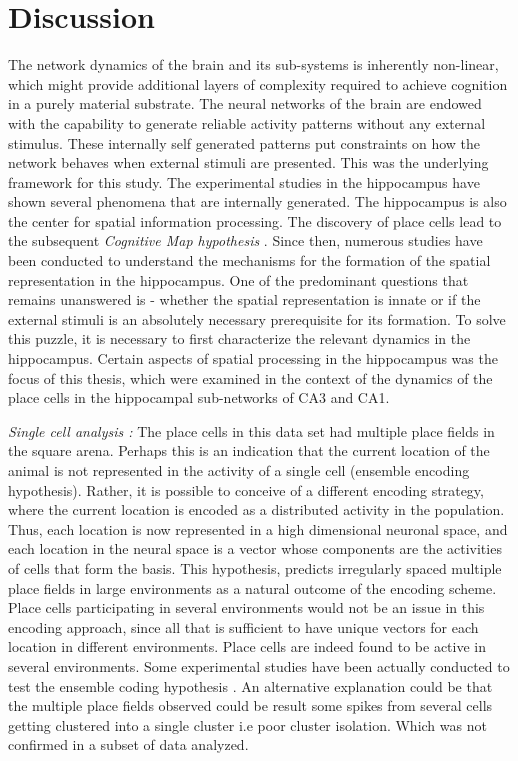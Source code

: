 \chapter{Discussion}

The network dynamics of the brain and its sub-systems is inherently non-linear, which might provide additional layers of complexity required to achieve cognition in a purely material substrate. The neural networks of the brain are endowed with the capability to generate reliable activity patterns without any external stimulus. These internally self generated patterns put constraints on how the network behaves when external stimuli are presented. This was the underlying framework for this study. The experimental studies in the hippocampus have shown several phenomena that are internally generated. The hippocampus is also the center for spatial information processing. The discovery of place cells \cite{O'Keefe1971a} lead to the subsequent \emph{Cognitive Map hypothesis} \cite{Street}. Since then, numerous studies have been conducted to understand the mechanisms for the formation of the spatial representation in the hippocampus. One of the predominant questions that remains unanswered is - whether the spatial representation is innate or if the external stimuli is an absolutely necessary prerequisite for its formation. To solve this puzzle, it is necessary to first characterize the relevant dynamics in the hippocampus. Certain aspects of spatial processing in the hippocampus was the focus of this thesis, which were examined in the context of the dynamics of the place cells in the hippocampal sub-networks of CA3 and CA1. 

\emph{Single cell analysis : }
The place cells in this data set had multiple place fields in the square arena. Perhaps this is an indication that the current location of the animal is not represented in the activity of a single cell (ensemble encoding hypothesis). Rather, it is possible to conceive of a different encoding strategy, where the current location is encoded as a distributed activity in the population. Thus, each location is now represented in a high dimensional neuronal space, and each location in the neural space is a vector whose components are the activities of cells that form the basis. This hypothesis, predicts irregularly spaced multiple place fields in large environments as a natural outcome of the encoding scheme. Place cells participating in several environments would not be an issue in this encoding approach, since all that is sufficient to have unique vectors for each location in different environments. Place cells are indeed found to be active in several environments\cite{Kubie1987}. Some experimental studies have been actually conducted to test the ensemble coding hypothesis \cite{Fenton2008}.  An alternative explanation could be that the multiple place fields observed could be result some spikes from several cells getting clustered into a single cluster i.e poor cluster isolation. Which was not confirmed in a subset of data analyzed. 

